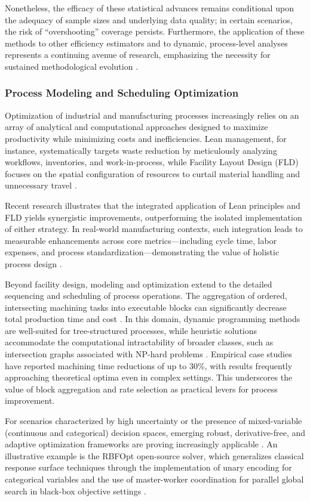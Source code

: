 \documentclass[sigconf]{acmart}
\begin{document}
Nonetheless, the efficacy of these statistical advances remains conditional upon the adequacy of sample sizes and underlying data quality; in certain scenarios, the risk of ``overshooting'' coverage persists. Furthermore, the application of these methods to other efficiency estimators and to dynamic, process-level analyses represents a continuing avenue of research, emphasizing the necessity for sustained methodological evolution \cite{ref87}.

\subsubsection{Process Modeling and Scheduling Optimization}

Optimization of industrial and manufacturing processes increasingly relies on an array of analytical and computational approaches designed to maximize productivity while minimizing costs and inefficiencies. Lean management, for instance, systematically targets waste reduction by meticulously analyzing workflows, inventories, and work-in-process, while Facility Layout Design (FLD) focuses on the spatial configuration of resources to curtail material handling and unnecessary travel \cite{ref81}.

Recent research illustrates that the integrated application of Lean principles and FLD yields synergistic improvements, outperforming the isolated implementation of either strategy. In real-world manufacturing contexts, such integration leads to measurable enhancements across core metrics—including cycle time, labor expenses, and process standardization—demonstrating the value of holistic process design \cite{ref81}.

Beyond facility design, modeling and optimization extend to the detailed sequencing and scheduling of process operations. The aggregation of ordered, intersecting machining tasks into executable blocks can significantly decrease total production time and cost \cite{ref82}. In this domain, dynamic programming methods are well-suited for tree-structured processes, while heuristic solutions accommodate the computational intractability of broader classes, such as intersection graphs associated with NP-hard problems \cite{ref82}. Empirical case studies have reported machining time reductions of up to 30\%, with results frequently approaching theoretical optima even in complex settings. This underscores the value of block aggregation and rate selection as practical levers for process improvement.

For scenarios characterized by high uncertainty or the presence of mixed-variable (continuous and categorical) decision spaces, emerging robust, derivative-free, and adaptive optimization frameworks are proving increasingly applicable \cite{ref77,ref78}. An illustrative example is the RBFOpt open-source solver, which generalizes classical response surface techniques through the implementation of unary encoding for categorical variables and the use of master-worker coordination for parallel global search in black-box objective settings \cite{ref77}.
\end{document}
